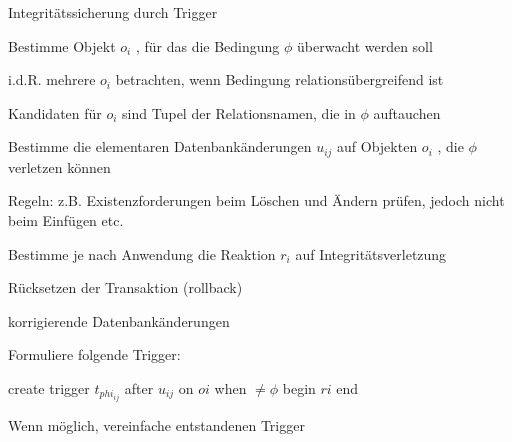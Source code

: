 \documentclass[a4paper]{article}
\begin{document}
\begin{multicols}{3}
\begin{itemize*}
        Integritätssicherung durch Trigger
        \begin{itemize*}
            \item Bestimme Objekt $o_i$ , für das die Bedingung $\phi$ überwacht werden soll
            \begin{itemize*}
                \item i.d.R. mehrere $o_i$ betrachten, wenn Bedingung relationsübergreifend ist
                \item Kandidaten für $o_i$ sind Tupel der Relationsnamen, die in $\phi$ auftauchen
            \end{itemize*}
            \item Bestimme die elementaren Datenbankänderungen $u_{ij}$ auf Objekten $o_i$ , die $\phi$ verletzen können
            \begin{itemize*}
                \item Regeln: z.B. Existenzforderungen beim Löschen und Ändern prüfen, jedoch nicht beim Einfügen etc.
            \end{itemize*}
            \item Bestimme je nach Anwendung die Reaktion $r_i$ auf Integritätsverletzung
            \begin{itemize*}
                \item Rücksetzen der Transaktion (rollback)
                \item korrigierende Datenbankänderungen
            \end{itemize*}
            \item Formuliere folgende Trigger:
            \begin{itemize*}
                \item create trigger $t_{phi_{ij}}$ after $u_{ij}$ on $o i$ when $\neq\phi$ begin $r i$ end
            \end{itemize*}
            \item Wenn möglich, vereinfache entstandenen Trigger
        \end{itemize*}


\end{itemize*}
\end{multicols}
\end{document}
